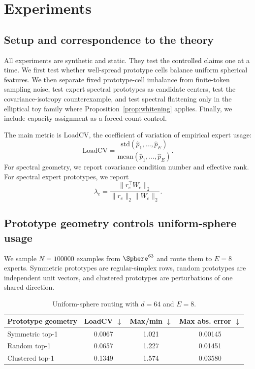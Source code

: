 \section{Experiments}

\subsection{Setup and correspondence to the theory}

All experiments are synthetic and static. They test the controlled claims one
at a time. We first test whether well-spread prototype cells balance uniform
spherical features. We then separate fixed prototype-cell imbalance from
finite-token sampling noise, test expert spectral prototypes as candidate
centers, test the covariance-isotropy counterexample, and test spectral
flattening only in the elliptical toy family where Proposition~\ref{prop:whitening}
applies. Finally, we include capacity assignment as a forced-count control.

The main metric is LoadCV, the coefficient of variation of empirical expert
usage:
\begin{equation}
 \mathrm{LoadCV}=\frac{\mathrm{std}(\widehat p_1,\ldots,\widehat p_E)}
 {\mathrm{mean}(\widehat p_1,\ldots,\widehat p_E)}.
\end{equation}
For spectral geometry, we report covariance condition number and effective
rank. For spectral expert prototypes, we report
\begin{equation}
 \lambda_e=\frac{\|r_e^\top W_e\|_2}{\|r_e\|_2\|W_e\|_2}.
\end{equation}

\subsection{Prototype geometry controls uniform-sphere usage}

We sample $N=100000$ examples from $\Sphere^{63}$ and route them to $E=8$
experts. Symmetric prototypes are regular-simplex rows, random prototypes are
independent unit vectors, and clustered prototypes are perturbations of one
shared direction.

\begin{table}[t]
\centering
\caption{Uniform-sphere routing with $d=64$ and $E=8$.}
\label{tab:uniform_sphere}
\small
\begin{tabular}{lccc}
\toprule
Prototype geometry & LoadCV $\downarrow$ & Max/min $\downarrow$
& Max abs. error $\downarrow$ \\
\midrule
Symmetric top-1 & 0.0067 & 1.021 & 0.00145 \\
Random top-1 & 0.0657 & 1.227 & 0.01451 \\
Clustered top-1 & 0.1349 & 1.574 & 0.03580 \\
\bottomrule
\end{tabular}
\end{table}

